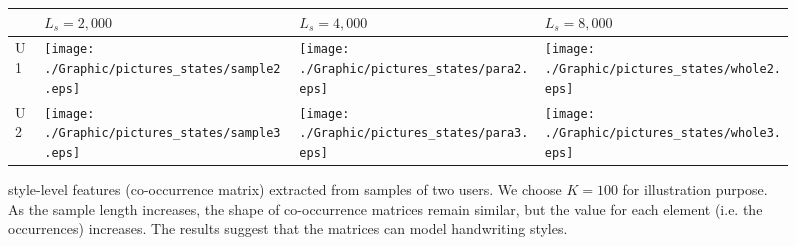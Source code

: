  \begin{figure}[!t]
 \vspace{-0mm}
 \scriptsize
 \centering
     \begin{tabular}{ m{0.2cm}  m{2.2cm} m{2.2cm} m{2.2cm} }
     \hline
   	   & \textbf{$L_s = 2,000$} & \textbf{$L_s = 4,000$} & \textbf{$L_s = 8,000$} \tabularnewline \hline \hline
     	U1
    & {\texttt{[image: ./Graphic/pictures\_states/sample2.eps]}}
    & {\texttt{[image: ./Graphic/pictures\_states/para2.eps]}}
	& {\texttt{[image: ./Graphic/pictures\_states/whole2.eps]}}\tabularnewline \hline
		U2
    & {\texttt{[image: ./Graphic/pictures\_states/sample3.eps]}}
    & {\texttt{[image: ./Graphic/pictures\_states/para3.eps]}}
	& {\texttt{[image: ./Graphic/pictures\_states/whole3.eps]}}\tabularnewline \hline
\end{tabular}
\vspace{-0mm}
\caption {{style-level features (co-occurrence matrix) extracted from samples of two users. We choose $K=100$ for illustration purpose.
 As the sample length increases, the shape of co-occurrence matrices remain similar, but the value for each element (i.e. the occurrences) increases. The results suggest that the matrices can model handwriting styles.
 }\vspace{-2mm}}\label{tab:sample-para-whole}
\end{figure}


 


